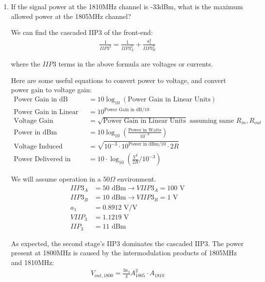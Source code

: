 \begin{enumerate}[label=(\alph*)]
    \item {\color{blue}If the signal power at the 1810MHz channel is -33dBm, what is the maximum allowed power at the 1805MHz channel?}

    We can find the cascaded IIP3 of the front-end:
    \begin{align*}
        \frac{1}{IIP3^2} = \frac{1}{IIP3_A^2} + \frac{a_1^2}{IIP3_B^2}
    \end{align*}

    where the $IIP3$ terms in the above formula are voltages or currents.

    Here are some useful equations to convert power to voltage, and convert power gain to voltage gain:
    \begin{align*}
        \text{Power Gain in dB} &= 10 \log_{10}(\text{Power Gain in Linear Units}) \\
        \text{Power Gain in Linear Units} &= 10^{\text{Power Gain in dB} / 10} \\
        \text{Voltage Gain} &= \sqrt{\text{Power Gain in Linear Units}} \text{ assuming same } R_{in}, R_{out} \\
        \text{Power in dBm} &= 10 \log_{10}(\frac{\text{Power in Watts}}{10^{-3}}) \\
        \text{Voltage Induced} &= \sqrt{10^{-3} \cdot 10^{\text{Power in dBm}/10} \cdot 2R} \\
        \text{Power Delivered in dBm} &= 10 \cdot \log_{10}(\frac{V^2}{2R} / 10^{-3})
    \end{align*}

    We will assume operation in a $50\Omega$ environment.
    \begin{align*}
        IIP3_A &= 50 \text{ dBm} \rightarrow VIIP3_A = 100 \text{ V} \\
        IIP3_B &= 10 \text{ dBm} \rightarrow VIIP3_B = 1 \text{ V} \\
        a_1 &= 0.8912 \text{ V/V} \\
        VIIP_3 &= 1.1219 \text{ V} \\
        IIP_3 &= 11 \text{ dBm}
    \end{align*}

    As expected, the second stage's IIP3 dominates the cascaded IIP3.
    The power present at 1800MHz is caused by the intermodulation products of 1805MHz and 1810MHz:
    \begin{align*}
        V_{out,1800} = \frac{3 a_3}{4} A_{1805}^2 \cdot A_{1810}
    \end{align*}


\end{enumerate}
